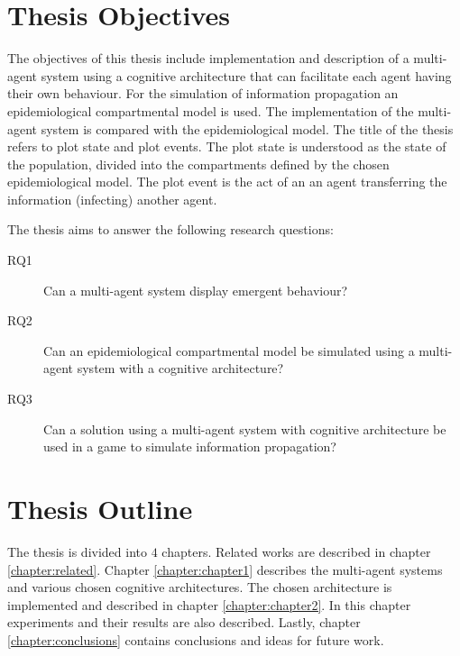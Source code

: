 \section*{Thesis Objectives}

The objectives of this thesis include implementation and description of a multi-agent system using a cognitive architecture that can facilitate each agent having their own behaviour.
For the simulation of information propagation an epidemiological compartmental model is used.
The implementation of the multi-agent system is compared with the epidemiological model.
The title of the thesis refers to plot state and plot events.
The plot state is understood as the state of the population, divided into the compartments defined by the chosen epidemiological model.
The plot event is the act of an an agent transferring the information (infecting) another agent.

The thesis aims to answer the following research questions:

\begin{description}
    \item[RQ1] Can a multi-agent system display emergent behaviour?
    \item[RQ2] Can an epidemiological compartmental model be simulated using a multi-agent system with a cognitive architecture?
    \item[RQ3] Can a solution using a multi-agent system with cognitive architecture be used in a game to simulate information propagation?
\end{description}


\section*{Thesis Outline}

The thesis is divided into $4$ chapters.
Related works are described in chapter \ref{chapter:related}.
Chapter \ref{chapter:chapter1} describes the multi-agent systems and various chosen cognitive architectures.
The chosen architecture is implemented and described in chapter \ref{chapter:chapter2}.
In this chapter experiments and their results are also described.
Lastly, chapter \ref{chapter:conclusions} contains conclusions and ideas for future work.



